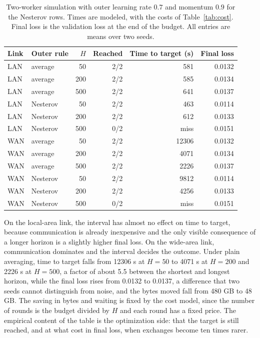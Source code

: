 \documentclass[11pt]{article}
\theoremstyle{definition}
\theoremstyle{remark}
\begin{document}
\begin{table}[h]
\centering
\small
\begin{tabular}{llrrrr}
\toprule
Link & Outer rule & $H$ & Reached & Time to target (s) & Final loss\\
\midrule
LAN & average  &  50 & 2/2 &   581 & 0.0132\\
LAN & average  & 200 & 2/2 &   585 & 0.0134\\
LAN & average  & 500 & 2/2 &   641 & 0.0137\\
LAN & Nesterov &  50 & 2/2 &   463 & 0.0114\\
LAN & Nesterov & 200 & 2/2 &   612 & 0.0133\\
LAN & Nesterov & 500 & 0/2 &  miss & 0.0151\\
\midrule
WAN & average  &  50 & 2/2 & 12306 & 0.0132\\
WAN & average  & 200 & 2/2 &  4071 & 0.0134\\
WAN & average  & 500 & 2/2 &  2226 & 0.0137\\
WAN & Nesterov &  50 & 2/2 &  9812 & 0.0114\\
WAN & Nesterov & 200 & 2/2 &  4256 & 0.0133\\
WAN & Nesterov & 500 & 0/2 &  miss & 0.0151\\
\bottomrule
\end{tabular}
\caption{Two-worker simulation with outer learning rate $0.7$ and momentum $0.9$ for the Nesterov rows. Times are modeled, with the costs of Table~\ref{tab:cost}. Final loss is the validation loss at the end of the budget. All entries are means over two seeds.}
\label{tab:intervals}
\end{table}

On the local-area link, the interval has almost no effect on time to target, because communication is already inexpensive and the only visible consequence of a longer horizon is a slightly higher final loss. On the wide-area link, communication dominates and the interval decides the outcome. Under plain averaging, time to target falls from 12306 s at $H=50$ to 4071 s at $H=200$ and 2226 s at $H=500$, a factor of about 5.5 between the shortest and longest horizon, while the final loss rises from 0.0132 to 0.0137, a difference that two seeds cannot distinguish from noise, and the bytes moved fall from 480 GB to 48 GB. The saving in bytes and waiting is fixed by the cost model, since the number of rounds is the budget divided by $H$ and each round has a fixed price. The empirical content of the table is the optimization side: that the target is still reached, and at what cost in final loss, when exchanges become ten times rarer.
\end{document}
